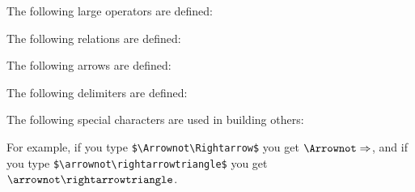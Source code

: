 { The following large operators are defined:
 \begin{symbols}
 \dosymbol\bigbox
 \dosymbol\bigcurlyvee
 \dosymbol\bigcurlywedge
 \dosymbol\biginterleave
 \dosymbol\bignplus
 \dosymbol\bigparallel
 \dosymbol\bigsqcap
 \dosymbol\bigtriangledown
 \dosymbol\bigtriangleup
 \end{symbols}
 The following relations are defined:
 \begin{symbols}
 \dosymbol\inplus
 \dosymbol\niplus
 \dosymbol\ntrianglelefteqslant
 \dosymbol\ntrianglerighteqslant
 \dosymbol\subsetplus
 \dosymbol\subsetpluseq
 \dosymbol\supsetplus
 \dosymbol\supsetpluseq
 \dosymbol\trianglelefteqslant
 \dosymbol\trianglerighteqslant
 \end{symbols}
 The following arrows are defined:
 \begin{symbols}
 \dosymbol\Longmapsfrom
 \dosymbol\Longmapsto
 \dosymbol\Mapsfrom
 \dosymbol\Mapsto
 \dosymbol\leftarrowtriangle
 \dosymbol\leftrightarroweq
 \dosymbol\leftrightarrowtriangle
 \dosymbol\lightning
 \dosymbol\longmapsfrom
 \dosymbol\mapsfrom
 \dosymbol\nnearrow
 \dosymbol\nnwarrow
 \dosymbol\rightarrowtriangle
 \dosymbol\rrparenthesis
 \dosymbol\shortdownarrow
 \dosymbol\shortleftarrow
 \dosymbol\shortrightarrow
 \dosymbol\shortuparrow
 \dosymbol\ssearrow
 \dosymbol\sswarrow
 \end{symbols}
 The following delimiters are defined:
 \begin{symbols}
 \dosymbol\Lbag
 \dosymbol\Rbag
 \dosymbol\lbag
 \dosymbol\llbracket
 \dosymbol\llceil
 \dosymbol\llfloor
 \dosymbol\llparenthesis
 \dosymbol\rbag
 \dosymbol\rrbracket
 \dosymbol\rrceil
 \dosymbol\rrfloor
 \end{symbols}
 The following special characters are used in building others:
 \begin{symbols}
 \dosymbol\Arrownot
 \dosymbol\Mapsfromchar
 \dosymbol\Mapstochar
 \dosymbol\arrownot
 \dosymbol\mapsfromchar
 \end{symbols}
 For example, if you type
 \verb|$\Arrownot\Rightarrow$|
 you get
 $\Arrownot\Rightarrow$,
 and if you type
 \verb|$\arrownot\rightarrowtriangle$|
 you get
 $\arrownot\rightarrowtriangle$.

}

